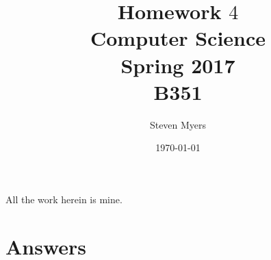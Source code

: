 \documentclass{article}
\begin{document}
\title{Homework $4$\\ Computer Science \\ Spring 2017\\ B351}         %
\author{Steven Myers}        %
\date{\today}          %
\maketitle

\makeatother     %

\pagestyle{plain}
All the work herein is mine.

\section*{Answers}
\end{document}
